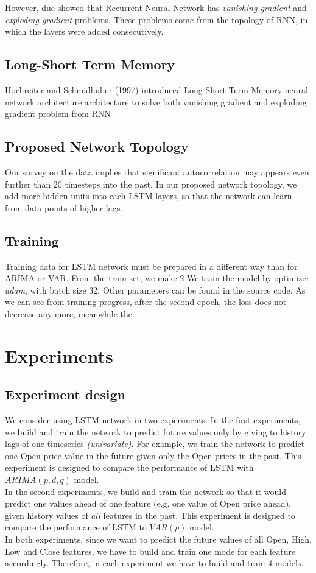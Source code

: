 \documentclass[11pt]{article}
\begin{document}
However, due showed that Recurrent Neural Network has \textit{vanishing
  gradient} and \textit{exploding gradient} problems. These problems come from
the topology of RNN, in which the layers were added consecutively.


\subsection{Long-Short Term Memory}
Hochreiter and Schmidhuber (1997) \cite{gers1999learning} introduced Long-Short
Term Memory neural network architecture architecture to solve both vanishing
gradient and exploding gradient problem from RNN

\subsection{Proposed Network Topology}
Our survey on the data implies that significant autocorrelation may appears even
further than 20 timesteps into the past. In our proposed network topology, we
add more hidden units into each LSTM layers, so that the network can learn from
data points of higher lags.

\subsection{Training}
Training data for LSTM network must be prepared in a different way than for
ARIMA or VAR. From the train set, we make 2
We train the model by optimizer \textit{adam}, with batch size 32. Other
parameters can be found in the source code. As we can see from training progress, after the second epoch, the loss does not
decrease any more, meanwhile the 


\section{Experiments}
\subsection{Experiment design}
We consider using LSTM network in two experiments. In the first experiments, we
build and train the network to predict future values only by giving to history
lags of one timeseries \textit{(univariate)}. For example, we train the network to
predict one Open price value in the future given only the Open prices in the
past. This experiment is designed to compare the performance of LSTM with
$ARIMA(p, d, q)$ model.\\ 
In the second experiments, we build and train the network so that it would
predict one values ahead of one feature (e.g. one value of Open price ahead),
given history values of \textit{all} features in the past. This experiment is
designed to compare the performance of LSTM to $VAR(p)$ model.\\
In both experiments, since we want to predict the future values of all Open,
High, Low and Close features, we have to build and train one mode for each
feature accordingly. Therefore, in each experiment we have to build and train 4
models.
\end{document}
